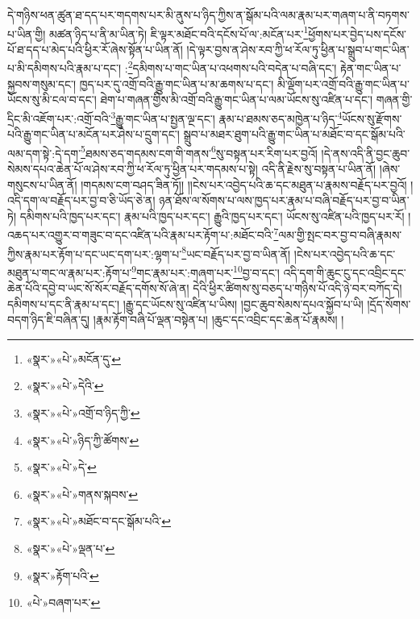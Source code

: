 དེ་གཉིས་ཕན་ཚུན་ཐ་དད་པར་གདགས་པར་མི་ནུས་པ་ཉིད་ཀྱིས་ན་སྒོམ་པའི་ལམ་རྣམ་པར་གཞག་པ་ནི་བཏགས་པ་ཡིན་གྱི། མཚན་ཉིད་པ་ནི་མ་ཡིན་ཏེ། ཇི་ལྟར་མཐོང་བའི་དངོས་པོ་ལ་:མངོན་པར་\footnote{«སྣར་»«པེ་»མངོན་དུ་}ཕྱོགས་པར་བྱེད་པས་དངོས་པོ་ཐ་དད་པ་མེད་པའི་ཕྱིར་རོ་ཞེས་སྟོན་པ་ཡིན་ནོ། །དེ་ལྟར་བྱས་ན་ཤེས་རབ་ཀྱི་ཕ་རོལ་ཏུ་ཕྱིན་པ་སྒྲུབ་པ་གང་ཡིན་པ་མི་དམིགས་པའི་རྣམ་པ་དང་། :\footnote{«སྣར་»«པེ་»དེའི་}དམིགས་པ་གང་ཡིན་པ་འཕགས་པའི་བདེན་པ་བཞི་དང་། རྟེན་གང་ཡིན་པ་སྐྱབས་གསུམ་དང་། ཁྱད་པར་དུ་འགྲོ་བའི་རྒྱུ་གང་ཡིན་པ་མ་ཆགས་པ་དང་། མི་ལྡོག་པར་འགྲོ་བའི་རྒྱུ་གང་ཡིན་པ་ཡོངས་སུ་མི་ངལ་བ་དང་། ཐེག་པ་གཞན་གྱིས་མི་འགྲོ་བའི་རྒྱུ་གང་ཡིན་པ་ལམ་ཡོངས་སུ་འཛིན་པ་དང་། གཞན་གྱི་དྲིང་མི་འཇོག་པར་:འགྲོ་བའི་\footnote{«སྣར་»«པེ་»འགྲོ་བ་ཉིད་ཀྱི་}རྒྱུ་གང་ཡིན་པ་སྤྱན་ལྔ་དང་། རྣམ་པ་ཐམས་ཅད་མཁྱེན་པ་ཉིད་\footnote{«སྣར་»«པེ་»ཉིད་ཀྱི་ཚོགས་}ཡོངས་སུ་རྫོགས་པའི་རྒྱུ་གང་ཡིན་པ་མངོན་པར་ཤེས་པ་དྲུག་དང་། སྒྲུབ་པ་མཐར་ཐུག་པའི་རྒྱུ་གང་ཡིན་པ་མཐོང་བ་དང་སྒོམ་པའི་ལམ་དག་སྟེ་:དེ་དག་\footnote{«སྣར་»«པེ་»དེ་}ཐམས་ཅད་གདམས་ངག་གི་གནས་\footnote{«སྣར་»«པེ་»གནས་སྐབས་}སུ་བསྟན་པར་རིག་པར་བྱའོ། །དེ་ནས་འདི་ནི་བྱང་ཆུབ་སེམས་དཔའ་ཆེན་པོ་ལ་ཤེས་རབ་ཀྱི་ཕ་རོལ་ཏུ་ཕྱིན་པར་གདམས་པ་སྟེ། འདི་ནི་རྗེས་སུ་བསྟན་པ་ཡིན་ནོ། །ཞེས་གསུངས་པ་ཡིན་ནོ། །གདམས་ངག་བཤད་ཟིན་ཏོ།། །།ངེས་པར་འབྱེད་པའི་ཆ་དང་མཐུན་པ་རྣམས་བརྗོད་པར་བྱའོ། །འདི་དག་ལ་བརྗོད་པར་བྱ་བ་ཅི་ཡོད་ཅེ་ན། ཉན་ཐོས་ལ་སོགས་པ་ལས་ཁྱད་པར་རྣམ་པ་བཞི་བརྗོད་པར་བྱ་བ་ཡིན་ཏེ། དམིགས་པའི་ཁྱད་པར་དང་། རྣམ་པའི་ཁྱད་པར་དང་། རྒྱུའི་ཁྱད་པར་དང་། ཡོངས་སུ་འཛིན་པའི་ཁྱད་པར་རོ། །འཆད་པར་འགྱུར་བ་གཟུང་བ་དང་འཛིན་པའི་རྣམ་པར་རྟོག་པ་:མཐོང་བའི་\footnote{«སྣར་»«པེ་»མཐོང་བ་དང་སྒོམ་པའི་}ལམ་གྱི་སྤང་བར་བྱ་བ་བཞི་རྣམས་ཀྱིས་རྣམ་པར་རྟོག་པ་དང་ཡང་དག་པར་:ལྷག་པ་\footnote{«སྣར་»«པེ་»ལྡན་པ་}ཡང་བརྗོད་པར་བྱ་བ་ཡིན་ནོ། །ངེས་པར་འབྱེད་པའི་ཆ་དང་མཐུན་པ་གང་ལ་རྣམ་པར་:རྟོག་པ་\footnote{«སྣར་»རྟོག་པའི་}གང་རྣམ་པར་:གཞག་པར་\footnote{«པེ་»བཞག་པར་}བྱ་བ་དང་། འདི་དག་གི་ཆུང་ངུ་དང་འབྲིང་དང་ཆེན་པོའི་དབྱེ་བ་ཡང་སོ་སོར་བརྗོད་དགོས་སོ་ཞེ་ན། དེའི་ཕྱིར་ཚིགས་སུ་བཅད་པ་གཉིས་པོ་འདི་ཉེ་བར་བཀོད་དེ། དམིགས་པ་དང་ནི་རྣམ་པ་དང་། །རྒྱུ་དང་ཡོངས་སུ་འཛིན་པ་ཡིས། །བྱང་ཆུབ་སེམས་དཔའ་སྐྱོབ་པ་ཡི། །དྲོད་སོགས་བདག་ཉིད་ཇི་བཞིན་དུ། །རྣམ་རྟོག་བཞི་པོ་ལྡན་བསྟེན་པ། །ཆུང་དང་འབྲིང་དང་ཆེན་པོ་རྣམས། །
